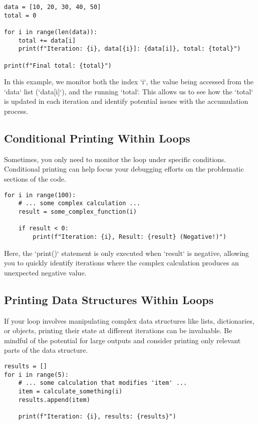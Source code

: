 \documentclass{article}
\begin{document}
{{{\begin{verbatim}
data = [10, 20, 30, 40, 50]
total = 0

for i in range(len(data)):
    total += data[i]
    print(f"Iteration: {i}, data[{i}]: {data[i]}, total: {total}")

print(f"Final total: {total}")
\end{verbatim}

In this example, we monitor both the index `i`, the value being accessed from the `data` list (`data[i]`), and the running `total`. This allows us to see how the `total` is updated in each iteration and identify potential issues with the accumulation process.

\subsection*{Conditional Printing Within Loops}

Sometimes, you only need to monitor the loop under specific conditions. Conditional printing can help focus your debugging efforts on the problematic sections of the code.

\begin{verbatim}
for i in range(100):
    # ... some complex calculation ...
    result = some_complex_function(i)

    if result < 0:
        print(f"Iteration: {i}, Result: {result} (Negative!)")
\end{verbatim}

Here, the `print()` statement is only executed when `result` is negative, allowing you to quickly identify iterations where the complex calculation produces an unexpected negative value.

\subsection*{Printing Data Structures Within Loops}

If your loop involves manipulating complex data structures like lists, dictionaries, or objects, printing their state at different iterations can be invaluable. Be mindful of the potential for large outputs and consider printing only relevant parts of the data structure.

\begin{verbatim}
results = []
for i in range(5):
    # ... some calculation that modifies 'item' ...
    item = calculate_something(i)
    results.append(item)

    print(f"Iteration: {i}, results: {results}")
\end{verbatim}

}}}
\end{document}
